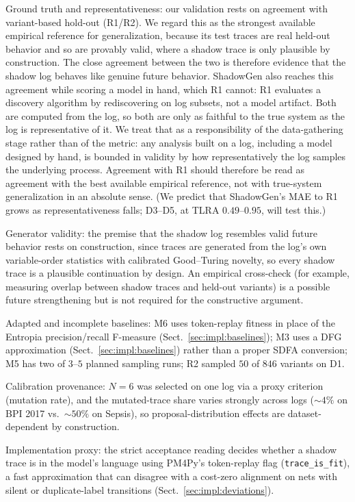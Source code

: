 \documentclass[runningheads]{llncs}
\begin{document}
Ground truth and representativeness: our validation rests on agreement with variant-based hold-out (R1/R2). We regard this as the strongest available empirical reference for generalization, because its test traces are real held-out behavior and so are provably valid, where a shadow trace is only plausible by construction. The close agreement between the two is therefore evidence that the shadow log behaves like genuine future behavior. ShadowGen also reaches this agreement while scoring a model in hand, which R1 cannot: R1 evaluates a discovery algorithm by rediscovering on log subsets, not a model artifact. Both are computed from the log, so both are only as faithful to the true system as the log is representative of it. We treat that as a responsibility of the data-gathering stage rather than of the metric: any analysis built on a log, including a model designed by hand, is bounded in validity by how representatively the log samples the underlying process. Agreement with R1 should therefore be read as agreement with the best available empirical reference, not with true-system generalization in an absolute sense. (We predict that ShadowGen's MAE to R1 grows as representativeness falls; D3--D5, at TLRA $0.49$--$0.95$, will test this.)

Generator validity: the premise that the shadow log resembles valid future behavior rests on construction, since traces are generated from the log's own variable-order statistics with calibrated Good--Turing novelty, so every shadow trace is a plausible continuation by design. An empirical cross-check (for example, measuring overlap between shadow traces and held-out variants) is a possible future strengthening but is not required for the constructive argument.

Adapted and incomplete baselines: M6 uses token-replay fitness in place of the Entropia precision/recall F-measure (Sect.~\ref{sec:impl:baselines}); M3 uses a DFG approximation (Sect.~\ref{sec:impl:baselines}) rather than a proper SDFA conversion; M5 has two of $3$--$5$ planned sampling runs; R2 sampled $50$ of $846$ variants on D1.

Calibration provenance: $N{=}6$ was selected on one log via a proxy criterion (mutation rate), and the mutated-trace share varies strongly across logs ($\sim4\%$ on BPI 2017 vs.\ $\sim50\%$ on Sepsis), so proposal-distribution effects are dataset-dependent by construction.

Implementation proxy: the strict acceptance reading decides whether a shadow trace is in the model's language using PM4Py's token-replay flag (\texttt{trace\_is\_fit}), a fast approximation that can disagree with a cost-zero alignment on nets with silent or duplicate-label transitions (Sect.~\ref{sec:impl:deviations}).
\end{document}
